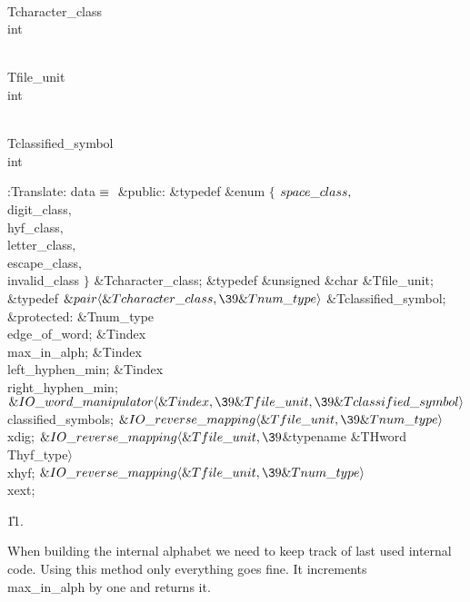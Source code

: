\Y\B\F\\{Tcharacter\_class} \5
\\{int}\par
\B\F\\{Tfile\_unit} \5
\\{int}\par
\B\F\\{Tclassified\_symbol} \5
\\{int}\par
\Y\B\4:Translate: data\X${}\equiv{}$\6
\4\&{public}:\6
\&{typedef} \&{enum} ${}\{{}$\1\6
${}\\{space\_class},{}$\6
\\{digit\_class}${},{}$\6
\\{hyf\_class}${},{}$\6
\\{letter\_class}${},{}$\6
\\{escape\_class}${},{}$\6
\\{invalid\_class}\2\6
${}\}{}$ \&{Tcharacter\_class};\7
\&{typedef} \&{unsigned} \&{char} \&{Tfile\_unit};\7
\&{typedef} ${}\&{pair}\langle\&{Tcharacter\_class},\39\&{Tnum\_type}\rangle{}$
\&{Tclassified\_symbol};\7
\4\&{protected}:\6
\&{Tnum\_type} \\{edge\_of\_word};\7
\&{Tindex} \\{max\_in\_alph};\6
\&{Tindex} \\{left\_hyphen\_min};\6
\&{Tindex} \\{right\_hyphen\_min};\7
${}\&{IO\_word\_manipulator}\langle\&{Tindex},\39\&{Tfile\_unit},\39%
\&{Tclassified\_symbol}\rangle{}$ \\{classified\_symbols};\7
${}\&{IO\_reverse\_mapping}\langle\&{Tfile\_unit},\39\&{Tnum\_type}\rangle{}$ %
\\{xdig};\6
${}\&{IO\_reverse\_mapping}\langle\&{Tfile\_unit},\39{}$\&{typename} \&{THword}%
\DC\\{Thyf\_type}${}\rangle{}$ \\{xhyf};\6
${}\&{IO\_reverse\_mapping}\langle\&{Tfile\_unit},\39\&{Tnum\_type}\rangle{}$ %
\\{xext};\par
\U11.\fi

When building the internal alphabet we need to keep track of last used
internal code. Using this method only everything goes fine.
It increments \\{max\_in\_alph} by one and returns it.


